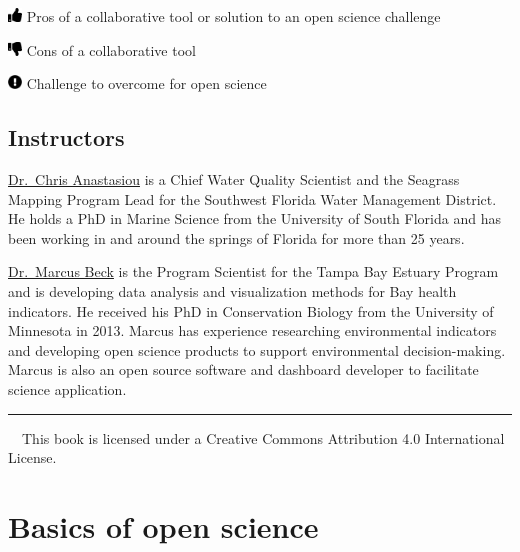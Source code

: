 \documentclass[
  letterpaper,
  DIV=11,
  numbers=noendperiod]{scrreprt}
\begin{document}
\includegraphics[width=1em,height=1em]{./index_files/figure-pdf/fa-icon-e4ee65476be467d7be8a1ae9cb02ffda.pdf}
Pros of a collaborative tool or solution to an open science challenge

\includegraphics[width=1em,height=1em]{./index_files/figure-pdf/fa-icon-c9ddf618df48250f2c0ed0cb59d4f20d.pdf}
Cons of a collaborative tool

\includegraphics[width=1em,height=1em]{./index_files/figure-pdf/fa-icon-e38cc40f3c6469ef5f44a7764a5c5910.pdf}
Challenge to overcome for open science

\hypertarget{instructors}{%
\section*{Instructors}\label{instructors}}

\href{mailto:chris.anastasiou@swfwmd.state.fl.us}{Dr.~Chris Anastasiou}
is a Chief Water Quality Scientist and the Seagrass Mapping Program Lead
for the Southwest Florida Water Management District. He holds a PhD in
Marine Science from the University of South Florida and has been working
in and around the springs of Florida for more than 25 years.

\href{mailto:mbeck@tbep.org}{Dr.~Marcus Beck} is the Program Scientist
for the Tampa Bay Estuary Program and is developing data analysis and
visualization methods for Bay health indicators. He received his PhD in
Conservation Biology from the University of Minnesota in 2013. Marcus
has experience researching environmental indicators and developing open
science products to support environmental decision-making. Marcus is
also an open source software and dashboard developer to facilitate
science application.

\begin{center}\rule{0.5\linewidth}{0.5pt}\end{center}

~~This book is licensed under a Creative Commons Attribution 4.0
International License.


\hypertarget{basics}{%
\chapter{Basics of open science}\label{basics}}
\end{document}
